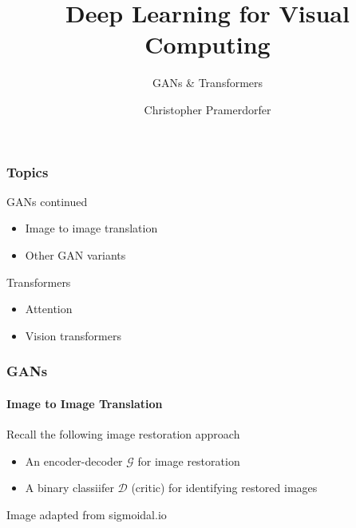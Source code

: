 \documentclass[xetex,professionalfont]{beamer}
\title{Deep Learning for Visual Computing}
\subtitle{GANs \& Transformers}
\author{Christopher Pramerdorfer}
\institute{Computer Vision Lab, TU Wien}
\newcommand{\cD}{\mathcal{D}}
\newcommand{\cG}{\mathcal{G}}
\begin{document}
\begin{frame}
	\maketitle
\end{frame}


\begin{frame}
	\frametitle{Topics}

	GANs continued
	\begin{itemize}
		\item Image to image translation
		\item Other GAN variants
	\end{itemize}

	\bigskip

	Transformers
	\begin{itemize}
		\item Attention
		\item Vision transformers
	\end{itemize}

\end{frame}


\begin{frame}
	\frametitle{GANs}
	\framesubtitle{Image to Image Translation}

	Recall the following image restoration approach
	\begin{itemize}
		\item An encoder-decoder $\cG$ for image restoration
		\item A binary classiifer $\cD$ (critic) for identifying restored images
	\end{itemize}

	\smallskip

	\begin{center}
		{\centering Image adapted from sigmoidal.io}
	\end{center}

\end{frame}
\end{document}
